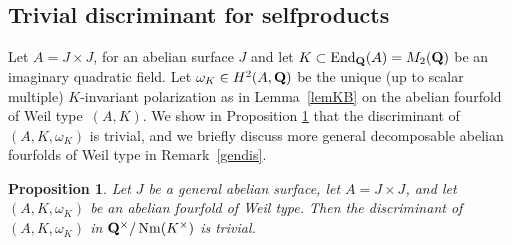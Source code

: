 \documentclass[pdftex]{sigma}
\numberwithin{equation}{section}
\newtheorem{Proposition}[Theorem]{Proposition}
 { \theoremstyle{definition}
\newtheorem{Definition}[Theorem]{Definition}
\newtheorem{Note}[Theorem]{Note}
\newtheorem{Example}[Theorem]{Example}
\newtheorem{Remark}[Theorem]{Remark} }
\begin{document}
\subsection{Trivial discriminant for selfproducts}\label{triv}
Let $A=J\times J$, for an abelian surface $J$ and let $K\subset \operatorname{End}_{\bf Q}(A)=M_2({\bf Q})$ be an
imaginary quadratic field.
Let $\omega_K\in H^2(A,{\bf Q})$ be the unique
(up to scalar multiple) $K$-invariant
polarization as in Lemma~\ref{lemKB} on the abelian fourfold of Weil type~$(A,K)$.
We show in Proposition \ref{triv dis} that the discriminant of
$(A,K,\omega_K)$ is trivial, and we briefly discuss more general decomposable
abelian fourfolds of Weil type in Remark~\ref{gendis}.

\begin{Proposition}\label{triv dis}
Let $J$ be a general abelian surface, let $A=J\times J$,
and let $(A,K,\omega_K)$ be an abelian fourfold of Weil type.
Then the discriminant of $(A,K,\omega_K)$ in ${\bf Q}^\times/\operatorname{Nm}(K^\times)$ is trivial.
\end{Proposition}
\end{document}
